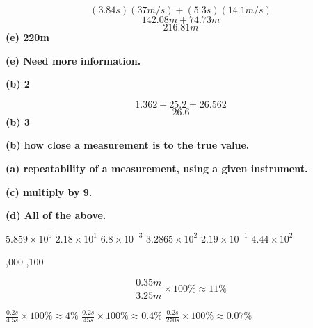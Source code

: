 \documentclass[11pt,largemargins]{homework}
\begin{document}
\maketitle

\renewcommand{\questiontype}{MisConcQ}
\setcounter{questionCounter}{1}
\question

$$ (3.84s)(37m/s)+(5.3s)(14.1m/s) $$
$$ 142.08m+74.73m $$
$$ 216.81m $$
\textbf{(e) 220m}

\question
\textbf{(e) Need more information.}

\question
\textbf{(b) 2}

\question
$$ 1.362 + 25.2 = 26.562 $$
$$ 26.6 $$
\textbf{(b) 3}

\question
\textbf{(b) how close a measurement is to the true value.}

\question
\textbf{(a) repeatability of a measurement, using a given instrument.}

\question
\textbf{(c) multiply by 9.}

\setcounter{questionCounter}{9}
\question
\textbf{(d) All of the above.}

\renewcommand{\questiontype}{Problem}
\setcounter{questionCounter}{0}
\question
  \begin{alphaparts}
  \end{alphaparts}

\question
  \begin{alphaparts}
    \questionpart $ 5.859 \times 10^0 $
    \questionpart $ 2.18 \times 10^1 $
    \questionpart $ 6.8 \times 10^{-3} $
    \questionpart $ 3.2865 \times 10^2 $
    \questionpart $ 2.19 \times 10^{-1} $
    \questionpart $ 4.44 \times 10^2 $
  \end{alphaparts}

\question
  \begin{alphaparts}
    ,000
    ,100
  \end{alphaparts}

\question
$$ \frac{0.35m}{3.25m} \times 100\% \approx \boxed{11\%} $$ 

\question
  \begin{alphaparts}
    \questionpart $ \frac{0.2s}{4.5s} \times 100\% \approx \boxed{4\%} $ 
    \questionpart $ \frac{0.2s}{45s} \times 100\% \approx \boxed{0.4\%} $ 
    \questionpart $ \frac{0.2s}{270s} \times 100\% \approx \boxed{0.07\%} $ 
  \end{alphaparts}
\end{document}
